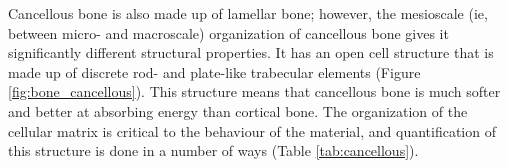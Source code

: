 Cancellous bone is also made up of lamellar bone; however, the mesioscale (\acs{ie}, between micro- and macroscale) organization of cancellous bone gives it significantly different structural properties.
It has an open cell structure that is made up of discrete rod- and plate-like trabecular elements (Figure \ref{fig:bone_cancellous}).
This structure means that cancellous bone is much softer and better at absorbing energy than cortical bone.
The organization of the cellular matrix is critical to the behaviour of the material, and quantification of this structure is done in a number of ways (Table \ref{tab:cancellous}).

\newcommand{\lbCell}[2][c]
{ 
\begin{tabular}[#1]{ c }
	#2
\end{tabular}
}

